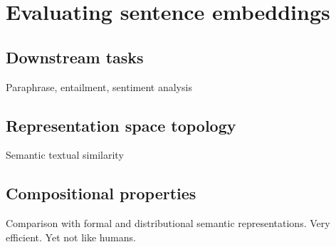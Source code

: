 \setchapterpreamble[u]{\margintoc}
\chapter{Evaluating sentence embeddings}

\section{Downstream tasks}

Paraphrase, entailment, sentiment analysis

\section{Representation space topology}

Semantic textual similarity

\section{Compositional properties}

Comparison with formal and distributional semantic representations. Very efficient. Yet not like humans.
